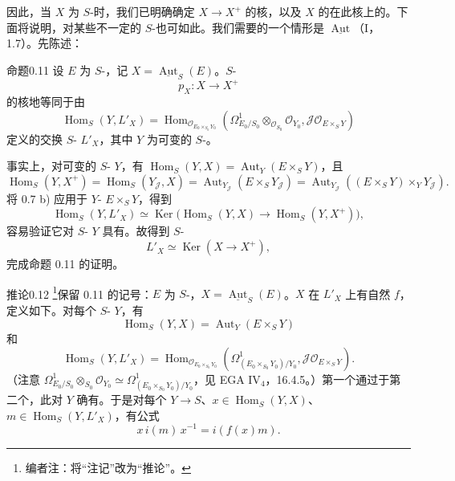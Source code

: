 因此，当 $X$ 为 $S$-时，我们已明确确定 $X\to X^+$ 的核，以及 $X$ 的在此核上的。下面将说明，对某些不一定的 $S$-也可如此。我们需要的一个情形是 $\underline{\operatorname{Aut}}$（I，1.7）。先陈述：
\begin{SGAresult}{命题}{0.11}
设 $E$ 为 $S$-，记 $X=\underline{\operatorname{Aut}}_S(E)$。$S$-
\[p_X:X\longrightarrow X^+\]
的核地等同于由
\[\operatorname{Hom}_S(Y,L'_X)=\operatorname{Hom}_{\mathcal O_{E_0\times_{S_0}Y_0}}(\Omega^1_{E_0/S_0}\otimes_{\mathcal O_{S_0}}\mathcal O_{Y_0},\mathcal J\mathcal O_{E\times_S Y})\]
定义的交换 $S$- $L'_X$，其中 $Y$ 为可变的 $S$-。
\end{SGAresult}
事实上，对可变的 $S$- $Y$，有 $\operatorname{Hom}_S(Y,X)=\operatorname{Aut}_Y(E\times_S Y)$，且
\[\operatorname{Hom}_S(Y,X^+)=\operatorname{Hom}_S(Y_{\mathcal J},X)=\operatorname{Aut}_{Y_{\mathcal J}}(E\times_S Y_{\mathcal J})=\operatorname{Aut}_{Y_{\mathcal J}}((E\times_S Y)\times_Y Y_{\mathcal J}).\]
将 0.7 b) 应用于 $Y$- $E\times_S Y$，得到
\[\operatorname{Hom}_S(Y,L'_X)\simeq\operatorname{Ker}\bigl(\operatorname{Hom}_S(Y,X)\longrightarrow\operatorname{Hom}_S(Y,X^+)\bigr),\]
容易验证它对 $S$- $Y$ 具有。故得到 $S$-
\[L'_X\simeq\operatorname{Ker}(X\longrightarrow X^+),\]
完成命题 0.11 的证明。
\begin{SGAresult}{推论}{0.12}
\footnote{编者注：将“注记”改为“推论”。}保留 0.11 的记号：$E$ 为 $S$-，$X=\underline{\operatorname{Aut}}_S(E)$。$X$ 在 $L'_X$ 上有自然 $f$，定义如下。对每个 $S$- $Y$，有
\[\operatorname{Hom}_S(Y,X)=\operatorname{Aut}_Y(E\times_S Y)\]
和
\[\operatorname{Hom}_S(Y,L'_X)=\operatorname{Hom}_{\mathcal O_{E_0\times_{S_0}Y_0}}(\Omega^1_{(E_0\times_{S_0}Y_0)/Y_0},\mathcal J\mathcal O_{E\times_S Y}).\]
（注意 $\Omega^1_{E_0/S_0}\otimes_{S_0}\mathcal O_{Y_0}\simeq\Omega^1_{(E_0\times_{S_0}Y_0)/Y_0}$，见 EGA IV$_4$，16.4.5。）第一个通过于第二个，此对 $Y$ 确有。于是对每个 $Y\to S$、$x\in\operatorname{Hom}_S(Y,X)$、$m\in\operatorname{Hom}_S(Y,L'_X)$，有公式
\[x\,i(m)\,x^{-1}=i(f(x)m).\tag{0.12.1}\]
\end{SGAresult}

